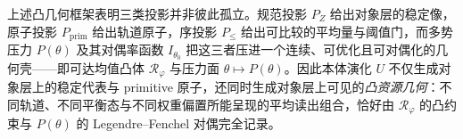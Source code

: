 \begin{remark}[三类投影在凸资源几何中的统一]\label{rem:pom-convex-projection-unification}
上述凸几何框架表明三类投影并非彼此孤立。规范投影 $P_Z$ 给出对象层的稳定像，原子投影 $P_{\mathrm{prim}}$ 给出轨道原子，序投影 $P_{\le}$ 给出可比较的平均量与阈值门，而多势压力 $P(\theta)$ 及其对偶率函数 $I_{\theta_0}$ 把这三者压进一个连续、可优化且可对偶化的几何壳——即可达均值凸体 $\mathcal{R}_\varphi$ 与压力面 $\theta\mapsto P(\theta)$。因此本体演化 $U$ 不仅生成对象层上的稳定代表与 primitive 原子，还同时生成对象层上可见的\emph{凸资源几何}：不同轨道、不同平衡态与不同权重偏置所能呈现的平均读出组合，恰好由 $\mathcal{R}_\varphi$ 的凸约束与 $P(\theta)$ 的 Legendre--Fenchel 对偶完全记录。
\end{remark}
